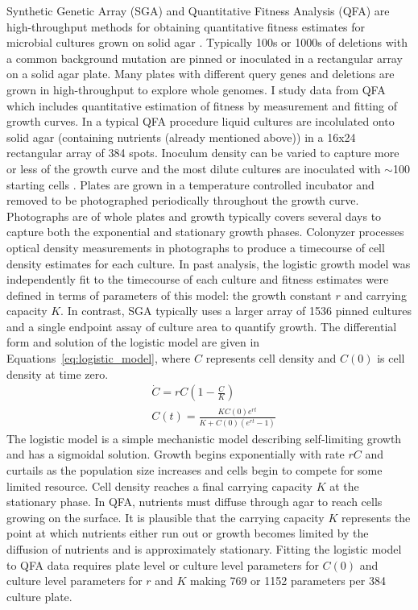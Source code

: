 Synthetic Genetic Array (SGA) and Quantitative Fitness Analysis (QFA)
are high-throughput methods for obtaining quantitative fitness
estimates for microbial cultures grown on solid agar
\citep{Baryshnikova2010sga,Banks2012}. Typically 100s or 1000s of
deletions with a common background mutation are pinned or inoculated
in a rectangular array on a solid agar plate. Many plates with
different query genes and deletions are grown in high-throughput to
explore whole genomes. I study data from QFA which includes
quantitative estimation of fitness by measurement and fitting of
growth curves. In a typical QFA procedure liquid cultures are
incolulated onto solid agar (containing nutrients (already mentioned
above)) in a 16x24 rectangular array of 384 spots. Inoculum density
can be varied to capture more or less of the growth curve and the most
dilute cultures are inoculated with \(\sim\)100 starting cells
\citep{Addinall2011}. Plates are grown in a temperature controlled
incubator and removed to be photographed periodically throughout the
growth curve. Photographs are of whole plates and growth typically
covers several days to capture both the exponential and stationary
growth phases. Colonyzer \citep{Lawless2010} processes optical density
measurements in photographs to produce a timecourse of cell density
estimates for each culture. In past analysis, the logistic growth
model was independently fit to the timecourse of each culture and
fitness estimates were defined in terms of parameters of this model:
the growth constant \(r\) and carrying capacity \(K\). In contrast,
SGA typically uses a larger array of 1536 pinned cultures and a single
endpoint assay of culture area to quantify growth. The differential
form and solution of the logistic model \citep{Verhulst1845} are given
in Equations~\ref{eq:logistic_model}, where \(C\) represents cell
density and \(C(0)\) is cell density at time zero.
\begin{subequations}
  \label{eq:logistic_model}
  \begin{align}
    &\dot{C} = rC\left(1 - \frac{C}{K}\right)\\
    &C(t) = \frac{KC(0)e^{rt}}{K + C(0)(e^{rt}-1)}
  \end{align}
\end{subequations}
%
The logistic model is a simple mechanistic model describing
self-limiting growth and has a sigmoidal solution. Growth begins
exponentially with rate \(rC\) and curtails as the population size
increases and cells begin to compete for some limited resource. Cell
density reaches a final carrying capacity \(K\) at the stationary
phase. In QFA, nutrients must diffuse through agar to reach cells
growing on the surface. It is plausible that the carrying capacity
\(K\) represents the point at which nutrients either run out or growth
becomes limited by the diffusion of nutrients and is approximately
stationary. Fitting the logistic model to QFA data requires plate
level or culture level parameters for \(C(0)\) and culture level
parameters for \(r\) and \(K\) making 769 or 1152 parameters per 384
culture plate.

